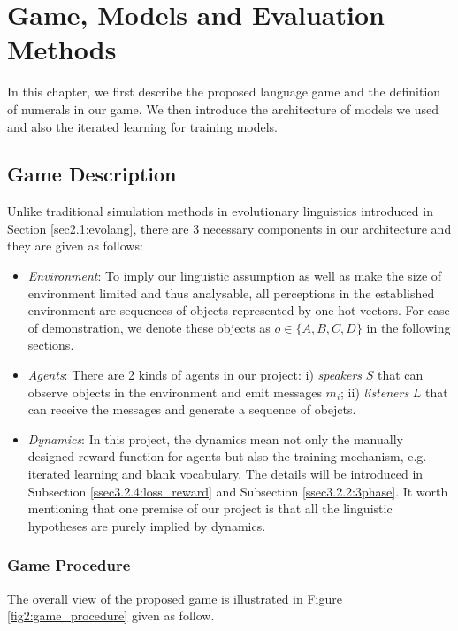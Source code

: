\chapter{Game, Models and Evaluation Methods}
\label{ch3:game_model}

In this chapter, we first describe the proposed language game and the definition of numerals in our game. We then introduce the architecture of models we used and also the iterated learning for training models.

\section{Game Description}
\label{sec3.1:game_description}

Unlike traditional simulation methods in evolutionary linguistics introduced in Section \ref{sec2.1:evolang}, there are 3 necessary components in our architecture and they are given as follows:

\begin{itemize}
  \item \textit{Environment}: To imply our linguistic assumption as well as make the size of environment limited and thus analysable, all perceptions in the established environment are sequences of objects represented by one-hot vectors. For ease of demonstration, we denote these objects as $o \in \{ A, B, C, D\}$ in the following sections.
  \item \textit{Agents}: There are 2 kinds of agents in our project: i) \textit{speakers} $S$ that can observe objects in the environment and emit messages $m_i$; ii) \textit{listeners} $L$ that can receive the messages and generate a sequence of obejcts.
  \item \textit{Dynamics}: In this project, the dynamics mean not only the manually designed reward function for agents but also the training mechanism, e.g. iterated learning and blank vocabulary. The details will be introduced in Subsection \ref{ssec3.2.4:loss_reward} and Subsection \ref{ssec3.2.2:3phase}. It worth mentioning that one premise of our project is that all the linguistic hypotheses are purely implied by dynamics.
\end{itemize}

\subsection{Game Procedure}
\label{ssec3.1.1:game_procedure}

The overall view of the proposed game is illustrated in Figure \ref{fig2:game_procedure} given as follow.

